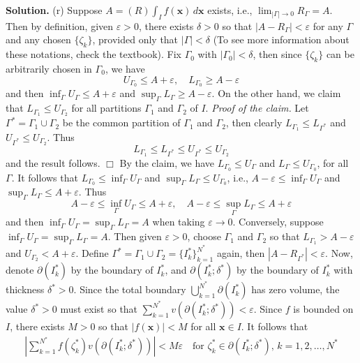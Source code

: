 \documentclass[12pt]{article}
\theoremstyle{definition}
\begin{document}
\smallskip
\noindent\textbf{Solution.}\quad
(r) Suppose $A=(R)\int_I f(\mathbf{x})\,d\mathbf{x}$ exists, i.e., $\lim_{\left\vert\Gamma\right\vert\to 0}R_\Gamma=A$. Then by definition, given $\varepsilon>0$, there exists $\delta>0$ so that $\left\vert A-R_\Gamma\right\vert<\varepsilon$ for any $\Gamma$ and any chosen $\{\zeta_k\}$, provided only that $\left\vert\Gamma\right\vert<\delta$ (To see more information about these notations, check the textbook). Fix $\Gamma_0$ with $\left\vert\Gamma_0\right\vert<\delta$, then since $\{\zeta_k\}$ can be arbitrarily chosen in $\Gamma_0$, we have
$$
U_{\Gamma_0}\le A+\varepsilon, \quad  L_{\Gamma_0}\ge A-\varepsilon
$$
and then $\inf_\Gamma U_\Gamma\le A+\varepsilon$ and $\sup_\Gamma L_\Gamma\ge A-\varepsilon$. On the other hand, we claim that $L_{\Gamma_1}\le U_{\Gamma_2}$ for all partitions $\Gamma_1$ and $\Gamma_2$ of $I$.
\textit{Proof of the claim.} Let $\Gamma^\ast=\Gamma_1\cup\Gamma_2$ be the common partition of $\Gamma_1$ and $\Gamma_2$, then clearly $L_{\Gamma_1}\le L_{\Gamma^\ast}$ and $U_{\Gamma^\ast}\le U_{\Gamma_2}$. Thus
$$
L_{\Gamma_1}\le L_{\Gamma^\ast}\le U_{\Gamma^\ast}\le U_{\Gamma_2}
$$
and the result follows. $\Box$
By the claim, we have $L_{\Gamma_0}\le U_{\Gamma}$ and $L_{\Gamma}\le U_{\Gamma_0}$, for all $\Gamma$. It follows that $L_{\Gamma_0}\le \inf_{\Gamma}U_{\Gamma}$ and $\sup_{\Gamma}L_{\Gamma}\le U_{\Gamma_0}$, i.e., $A-\varepsilon\le \inf_{\Gamma}U_{\Gamma}$ and $\sup_{\Gamma}L_{\Gamma}\le A+\varepsilon$. Thus
$$
A-\varepsilon\le \inf_{\Gamma}U_{\Gamma}\le A+\varepsilon, \quad
A-\varepsilon\le \sup_{\Gamma}L_{\Gamma}\le A+\varepsilon
$$
and then $\inf_{\Gamma}U_{\Gamma}=\sup_{\Gamma}L_{\Gamma}=A$ when taking $\varepsilon\to 0$. Conversely, suppose $\inf_\Gamma U_\Gamma=\sup_\Gamma L_\Gamma=A$. Then given $\varepsilon>0$, choose $\Gamma_1$ and $\Gamma_2$ so that $L_{\Gamma_1}>A-\varepsilon$ and $U_{\Gamma_2}<A+\varepsilon$. Define $\Gamma^\ast=\Gamma_1\cup\Gamma_2=\{I^\ast_k\}_{k=1}^{N^\ast}$ again, then $\left\vert A-R_{\Gamma^\ast}\right\vert<\varepsilon$. Now, denote $\partial(I^\ast_k)$ by the boundary of $I^\ast_k$, and $\partial(I^\ast_k;\delta^\ast)$ by the boundary of $I^\ast_k$ with thickness $\delta^\ast>0$. Since the total boundary $\bigcup_{k=1}^{N^\ast}\partial(I^\ast_k)$ has zero volume, the value $\delta^\ast>0$ must exist so that $\sum_{k=1}^{N^\ast}v(\partial(I^\ast_k;\delta^\ast))<\varepsilon$. Since $f$ is bounded on $I$, there exists $M>0$ so that $\left\vert f(\mathbf{x})\right\vert<M$ for all $\mathbf{x}\in I$. It follows that 
\begin{align*}
\left\vert\sum_{k=1}^{N^\ast}f(\zeta_{k}^\ast)v(\partial(I^\ast_k;\delta^\ast))\right\vert<M\varepsilon\quad
\mbox{for }\zeta_{k}^\ast\in\partial(I^\ast_k;\delta^\ast),\, k=1,2,\ldots,N^\ast
\end{align*}
\end{document}
